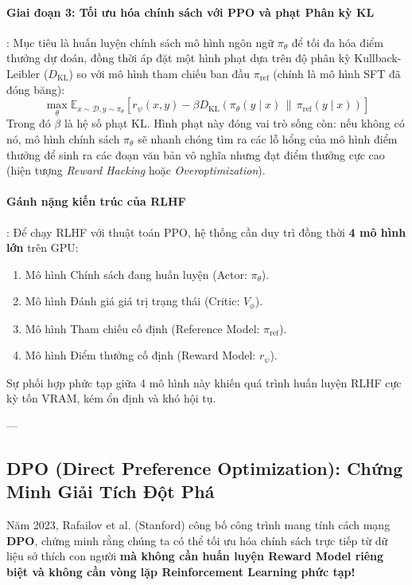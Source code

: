 \paragraph{Giai đoạn 3: Tối ưu hóa chính sách với PPO và phạt Phân kỳ KL}:
Mục tiêu là huấn luyện chính sách mô hình ngôn ngữ $\pi_\theta$ để tối đa hóa điểm thưởng dự đoán, đồng thời áp đặt một hình phạt dựa trên độ phân kỳ Kullback-Leibler ($D_{\text{KL}}$) so với mô hình tham chiếu ban đầu $\pi_{\text{ref}}$ (chính là mô hình SFT đã đóng băng):
\begin{equation}
\max_{\theta} \mathbb{E}_{x \sim \mathcal{D}, y \sim \pi_\theta} \left[ r_\psi(x, y) - \beta D_{\text{KL}}\left(\pi_\theta(y \mid x) \,\|\, \pi_{\text{ref}}(y \mid x)\right) \right]
\end{equation}
Trong đó $\beta$ là hệ số phạt KL. Hình phạt này đóng vai trò sống còn: nếu không có nó, mô hình chính sách $\pi_\theta$ sẽ nhanh chóng tìm ra các lỗ hổng của mô hình điểm thưởng để sinh ra các đoạn văn bản vô nghĩa nhưng đạt điểm thưởng cực cao (hiện tượng \textit{Reward Hacking} hoặc \textit{Overoptimization}).

\paragraph{Gánh nặng kiến trúc của RLHF}:
Để chạy RLHF với thuật toán PPO, hệ thống cần duy trì đồng thời \textbf{4 mô hình lớn} trên GPU:
\begin{enumerate}
  \item Mô hình Chính sách đang huấn luyện (Actor: $\pi_\theta$).
  \item Mô hình Đánh giá giá trị trạng thái (Critic: $V_\phi$).
  \item Mô hình Tham chiếu cố định (Reference Model: $\pi_{\text{ref}}$).
  \item Mô hình Điểm thưởng cố định (Reward Model: $r_\psi$).
\end{enumerate}
Sự phối hợp phức tạp giữa 4 mô hình này khiến quá trình huấn luyện RLHF cực kỳ tốn VRAM, kém ổn định và khó hội tụ.

---

\subsection{DPO (Direct Preference Optimization): Chứng Minh Giải Tích Đột Phá}
Năm 2023, Rafailov et al. (Stanford) công bố công trình mang tính cách mạng \textbf{DPO}, chứng minh rằng chúng ta có thể tối ưu hóa chính sách trực tiếp từ dữ liệu sở thích con người \textbf{mà không cần huấn luyện Reward Model riêng biệt và không cần vòng lặp Reinforcement Learning phức tạp!}

